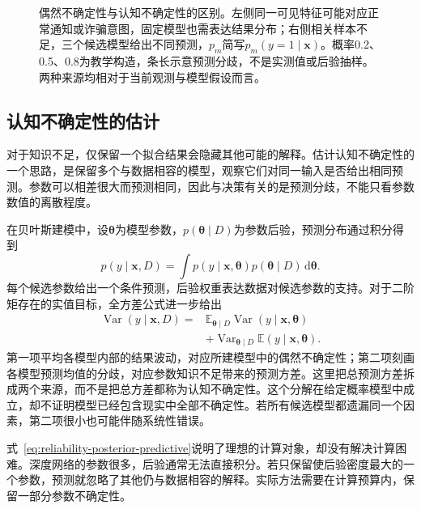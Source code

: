 \begin{figure}[htbp]
  \centering
  
  \caption{偶然不确定性与认知不确定性的区别。左侧同一可见特征可能对应正常通知或诈骗意图，固定模型也需表达结果分布；右侧相关样本不足，三个候选模型给出不同预测，$p_m$简写$p_m(y=1\mid\bm x)$。概率0.2、0.5、0.8为教学构造，条长示意预测分歧，不是实测值或后验抽样。两种来源均相对于当前观测与模型假设而言。}
  \label{fig:trust-uncertainty-sources}
\end{figure}

\subsection{认知不确定性的估计}
\label{sec:reliability-epistemic-estimation}

对于知识不足，仅保留一个拟合结果会隐藏其他可能的解释。估计认知不确定性的一个思路，是保留多个与数据相容的模型，观察它们对同一输入是否给出相同预测。参数可以相差很大而预测相同，因此与决策有关的是预测分歧，不能只看参数数值的离散程度。

在贝叶斯建模中，设$\bm{\theta}$为模型参数，$p(\bm{\theta}\mid D)$为参数后验，预测分布通过积分得到
\begin{equation}
 p(y\mid\bm{x},D)
 =\int p(y\mid\bm{x},\bm{\theta})
       p(\bm{\theta}\mid D)\,\mathrm d\bm{\theta}.
 \label{eq:reliability-posterior-predictive}
\end{equation}
每个候选参数给出一个条件预测，后验权重表达数据对候选参数的支持。对于二阶矩存在的实值目标，全方差公式进一步给出
\begin{equation}
 \begin{aligned}
 \operatorname{Var}(y\mid\bm{x},D)
 ={}&\mathbb E_{\bm{\theta}\mid D}
       \operatorname{Var}(y\mid\bm{x},\bm{\theta})\\
 &+\operatorname{Var}_{\bm{\theta}\mid D}
       \mathbb E(y\mid\bm{x},\bm{\theta}).
 \end{aligned}
 \label{eq:reliability-variance-decomposition}
\end{equation}
第一项平均各模型内部的结果波动，对应所建模型中的偶然不确定性；第二项刻画各模型预测均值的分歧，对应参数知识不足带来的预测方差。这里把总预测方差拆成两个来源，而不是把总方差都称为认知不确定性。这个分解在给定概率模型中成立，却不证明模型已经包含现实中全部不确定性。若所有候选模型都遗漏同一个因素，第二项很小也可能伴随系统性错误。

式~\eqref{eq:reliability-posterior-predictive}说明了理想的计算对象，却没有解决计算困难。深度网络的参数很多，后验通常无法直接积分。若只保留使后验密度最大的一个参数，预测就忽略了其他仍与数据相容的解释。实际方法需要在计算预算内，保留一部分参数不确定性。


